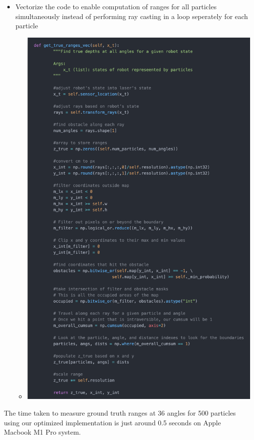 \documentclass[12pt, a4paper]{article}
\begin{document}
\begin{itemize}
  \item Vectorize the code to enable computation of ranges for all particles simultaneously instead of performing ray casting in a loop seperately for each particle
  \begin{itemize}
    \item 
    \begin{minipage}[t]{\linewidth}
      \vspace{0pt}
      \begin{center}
        \includegraphics[scale=0.3]{./results/ray_casting_opt_2.png}
        \label{fig:sm_1}
      \end{center}
    \end{minipage}
  \end{itemize}
\end{itemize}
The time taken to measure ground truth ranges at 36 angles for 500 particles using our optimized implementation is just around 0.5 seconds on Apple Macbook M1 Pro system.
\end{document}
